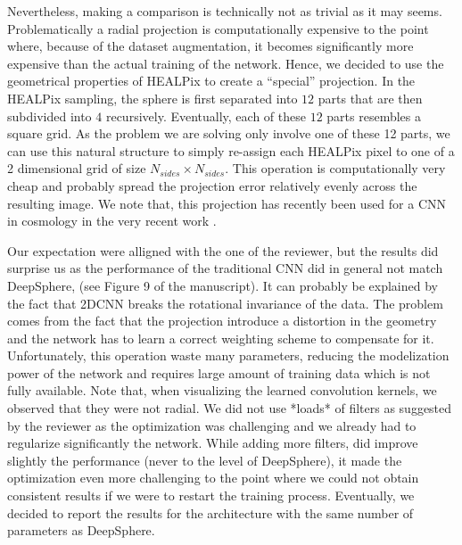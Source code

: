 \documentclass[12pt,a4paper]{article}
\newcommand{\TK}[1]{{\color{red}{TK: #1}}}
\newcommand{\1}{\b{1}}              %
\newcommand{\0}{\b{0}}              %
\begin{document}
Nevertheless, making a comparison is technically not as trivial as it may seems.
Problematically a radial projection is computationally expensive to the point where, because of the dataset augmentation, it becomes significantly more expensive than the actual training of the network.
Hence, we decided to use the geometrical properties of HEALPix to create a ``special'' projection.
In the HEALPix sampling, the sphere is first separated into $12$ parts that are then subdivided into $4$ recursively.
Eventually, each of these $12$ parts resembles a square grid.
As the problem we are solving only involve one of these 12 parts, we can use this natural structure to simply re-assign each HEALPix pixel to one of a 2 dimensional grid of size $N_{sides} \times N_{sides}$.
This operation is computationally very cheap and probably spread the projection error relatively evenly across the resulting image.
We note that, this projection has recently been used for a CNN in cosmology in the very recent work \cite{krachmalnicoff2019convolutional}.


Our expectation were alligned with the one of the reviewer, but the results did surprise us as the performance of the traditional CNN did in general not match DeepSphere, (see Figure 9 of the manuscript).
It can probably be explained by the fact that 2DCNN breaks the rotational invariance of the data.
The problem comes from the fact that the projection introduce a distortion in the geometry and the network has to learn a correct weighting scheme to compensate for it.
Unfortunately, this operation waste many parameters, reducing the modelization power of the network and requires large amount of training data which is not fully available.
Note that, when visualizing the learned convolution kernels, we observed that they were not radial.
We did not use *loads* of filters as suggested by the reviewer as the optimization was challenging and we already had to regularize significantly the network. 
While adding more filters, did improve slightly the performance (never to the level of DeepSphere), it made the optimization even more challenging to the point where we could not obtain consistent results if we were to restart the training process.
Eventually, we decided to report the results for the architecture with the same number of parameters as DeepSphere.


\end{document}
